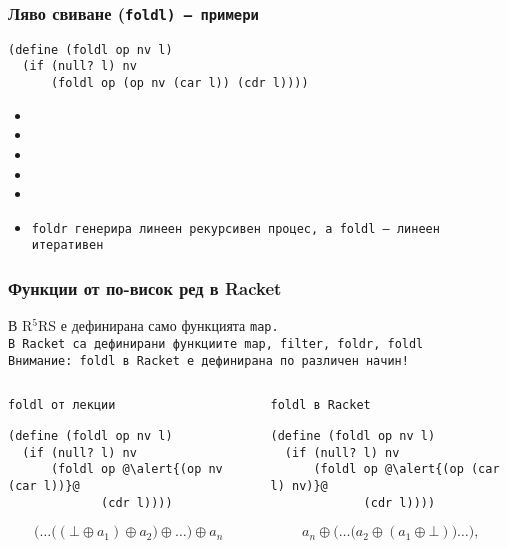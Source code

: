 \documentclass[alsotrans]{beamerswitch}
\begin{document}
\begin{frame}[fragile,label=foldlex]
  \frametitle{Ляво свиване (\tt{foldl}) --- примери}

\begin{lstlisting}
(define (foldl op nv l)
  (if (null? l) nv
      (foldl op (op nv (car l)) (cdr l))))
\end{lstlisting}
  \pause
  \small
  \begin{itemize}[<+->]
  \item {}
  \item {}
  \item {}
  \item {}
  \item {}
  \item \tt{foldr} генерира линеен рекурсивен процес, а \tt{foldl} --- линеен итеративен
  \end{itemize}
\end{frame}

\begin{frame}[fragile]
  \frametitle{Функции от по-висок ред в Racket}

  В R$^5$RS е дефинирана само функцията \tt{map}.\\
  В Racket са дефинирани функциите \tt{map}, \tt{filter}, \tt{foldr}, \tt{foldl}\\[2ex]
  \pause
  \alert{Внимание: \tt{foldl} в Racket е дефинирана по различен начин!}\\[2ex]
  \begin{columns}[T,onlytextwidth]
    \small
    \begin{column}{.5\textwidth}
      \tt{foldl} от лекции\\[2ex]
\begin{lstlisting}
(define (foldl op nv l)
  (if (null? l) nv
      (foldl op @\alert{(op nv (car l))}@
             (cdr l))))
\end{lstlisting}
      \begin{equation*}
        \Big(\ldots\big((\bot \oplus a_1) \oplus a_2\big) \oplus \ldots\Big) \oplus a_n
      \end{equation*}
    \end{column}
    \begin{column}{.5\textwidth}
      \tt{foldl} в Racket\\[2ex]
\begin{lstlisting}
(define (foldl op nv l)
  (if (null? l) nv
      (foldl op @\alert{(op (car l) nv)}@
             (cdr l))))
\end{lstlisting}
      \begin{equation*}
        a_n \oplus \Big(\ldots \big(a_2 \oplus (a_1 \oplus \bot)\big)\ldots\Big),
      \end{equation*}
    \end{column}
  \end{columns}
\end{frame}
\end{document}
